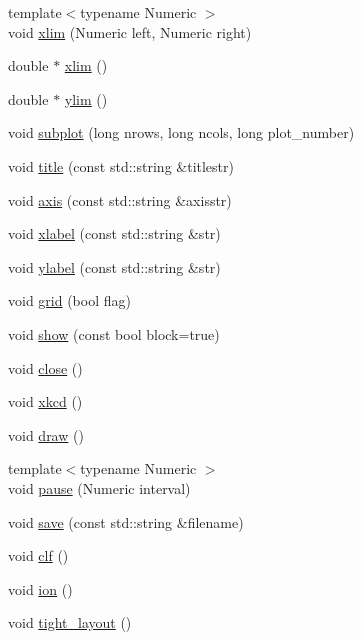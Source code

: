 \begin{DoxyCompactItemize}
\item 
{\footnotesize template$<$typename Numeric $>$ }\\void \hyperlink{namespacematplotlibcpp_a712cd34472b3687668048899bee4cdbf}{xlim} (Numeric left, Numeric right)
\item 
double $\ast$ \hyperlink{namespacematplotlibcpp_a8a7686cbe6e2e82e8bd09add8571b31c}{xlim} ()
\item 
double $\ast$ \hyperlink{namespacematplotlibcpp_a2bbe226f1dee9763197d9ab7692f4dc7}{ylim} ()
\item 
void \hyperlink{namespacematplotlibcpp_a78f4b6d50e52d1782d52df692232f4e1}{subplot} (long nrows, long ncols, long plot\+\_\+number)
\item 
void \hyperlink{namespacematplotlibcpp_aa9e0ff1c2399713260568f29c3e2188b}{title} (const std\+::string \&titlestr)
\item 
void \hyperlink{namespacematplotlibcpp_aab5287e30ebd90df0f5614d8da0f5291}{axis} (const std\+::string \&axisstr)
\item 
void \hyperlink{namespacematplotlibcpp_a8b8f1bb0cc3640fe5140f5a012e4a1c0}{xlabel} (const std\+::string \&str)
\item 
void \hyperlink{namespacematplotlibcpp_a5fa0cba78b9695adc213d2d952168442}{ylabel} (const std\+::string \&str)
\item 
void \hyperlink{namespacematplotlibcpp_ae0bbf80e73099a91df28e4fb871b166a}{grid} (bool flag)
\item 
void \hyperlink{namespacematplotlibcpp_ac7b2ae71a81811dfb69bcef95ee8390d}{show} (const bool block=true)
\item 
void \hyperlink{namespacematplotlibcpp_a62aaaf872c41a9d1b71add44c0cc0447}{close} ()
\item 
void \hyperlink{namespacematplotlibcpp_aca0fdbeae2fd86ab7291661f154f83ff}{xkcd} ()
\item 
void \hyperlink{namespacematplotlibcpp_acd9fc5bb7916c735390c2056214b12be}{draw} ()
\item 
{\footnotesize template$<$typename Numeric $>$ }\\void \hyperlink{namespacematplotlibcpp_aa5bc4092c9e2acbb2c6ec4efd024cf2f}{pause} (Numeric interval)
\item 
void \hyperlink{namespacematplotlibcpp_a46a2869ed7cd834e93125a20e2a294c2}{save} (const std\+::string \&filename)
\item 
void \hyperlink{namespacematplotlibcpp_adea4113b0ff7f393e18f1a99eb7e1718}{clf} ()
\item 
void \hyperlink{namespacematplotlibcpp_a9bddb5276ddc48f4ff9c2b36b98db71a}{ion} ()
\item 
void \hyperlink{namespacematplotlibcpp_a14e2b6e595e057f553ef7b14ddcda82a}{tight\+\_\+layout} ()
\end{DoxyCompactItemize}


